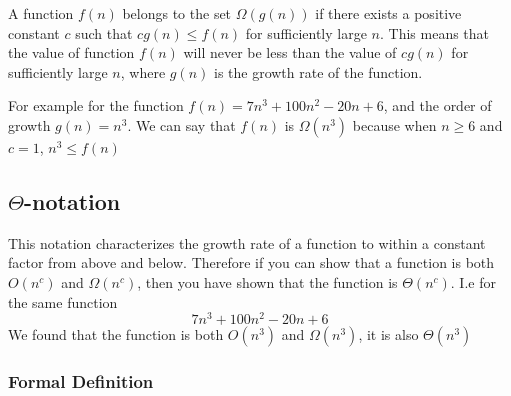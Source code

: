 \documentclass[12pt letter]{report}
\begin{document}
A function $f \left( n \right) $ belongs to the set $\Omega \left( g \left( n \right)  \right) $ if there exists a positive
constant $c$ such that $c g \left( n \right) \leq f \left( n \right)  $ for sufficiently large $n$. This means that the
value of function $f \left( n \right) $ will never be less than the value of $c g \left( n \right) $ for sufficiently large
$n$, where $g \left( n \right) $ is the growth rate of the function.

For example for the function $f \left( n \right) = 7n^3 + 100n^2 - 20n + 6 $, and the order of growth $g \left( n
  \right) = n^3 $. We can say that $f \left( n \right) $ is $\Omega \left( n^3 \right) $ because when $n \geq 6$ and $c =
  1$, $n^3 \leq f \left( n \right) $


\subsection{$\Theta$-notation}


This notation characterizes the growth rate of a function to within a constant factor from above and below. Therefore if
you can show that a function is both $O \left( n^c \right) $ and $\Omega \left( n^c \right) $, then you have shown that
the function is $\Theta \left( n^c \right) $. I.e for the same function
\[
  7n^3 + 100n^2 -20n + 6
\]
We found that the function is both $O \left( n^3 \right) $ and $\Omega \left( n^3 \right) $, it is also $\Theta \left(
  n^3 \right) $

\subsubsection{Formal Definition}
\end{document}
